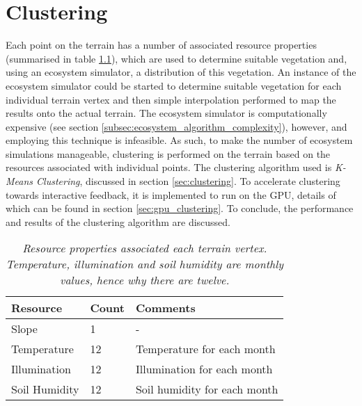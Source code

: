 \chapter{Clustering} \label{chap:clustering}

Each point on the terrain has a number of associated resource properties (summarised in table \ref{tab:point_resources}), which are used to determine suitable vegetation and, using an ecosystem simulator, a distribution of this vegetation. An instance of the ecosystem simulator could be started to determine suitable vegetation for each individual terrain vertex and then simple interpolation performed to map the results onto the actual terrain. The ecosystem simulator is computationally expensive (see section \ref{subsec:ecosystem_algorithm_complexity}), however, and employing this technique is infeasible. As such, to make the number of ecosystem simulations manageable, clustering is performed on the terrain based on the resources associated with individual points. The clustering algorithm used is \textit{K-Means Clustering}, discussed in section \ref{sec:clustering}. To accelerate clustering towards interactive feedback, it is implemented to run on the GPU, details of which can be found in section \ref{sec:gpu_clustering}. To conclude, the performance and results of the clustering algorithm are discussed.

\begin{table}[h]
  \centering
	    \begin{tabular}{|p{6cm}|p{3cm}|p{6cm}|}
		\hline	
  	    \textbf{Resource} & \textbf{Count} & \textbf{Comments} \\
  	    \hline	
  	    Slope & 1 & - \\
		\hline
  	    Temperature & 12 & Temperature for each month \\
		\hline
  	    Illumination & 12 & Illumination for each month \\
		\hline
  	    Soil Humidity & 12 & Soil humidity for each month \\
		\hline
		\end{tabular}
		\caption{\textit{Resource properties associated each terrain vertex. Temperature, illumination and soil humidity are monthly values, hence why there are twelve.}}
	  \label{tab:point_resources}
\end{table}



